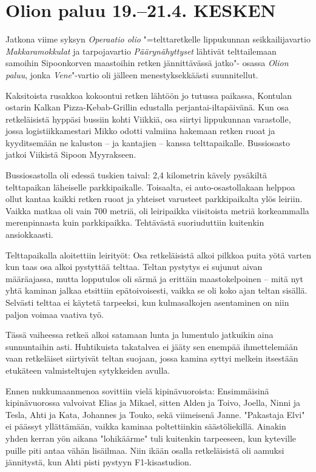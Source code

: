 
\section{Olion paluu 19.--21.4. KESKEN}

\begin{multicols}{2}

	\noindent Jatkona viime syksyn \textit{Operaatio olio} "=telttaretkelle lippukunnan
	seikkailijavartio \textit{Makkaramokkulat} ja tarpojavartio \textit{Päärynähyttyset} lähtivät
	telttailemaan samoihin Sipoonkorven maastoihin retken jännittävässä jatko"-
	osassa \textit{Olion paluu}, jonka \textit{Vene}"-vartio oli jälleen menestyksekkäästi
	suunnitellut.

	Kaksitoista rusakkoa kokoontui retken lähtöön jo tutussa paikassa,
	Kontulan ostarin Kalkan Pizza-Kebab-Grillin edustalla
	perjantai-iltapäivänä. Kun osa retkeläisistä hyppäsi bussiin kohti
	Viikkiä, osa siirtyi lippukunnan varastolle, jossa logistiikkamestari
	Mikko odotti valmiina hakemaan retken ruoat ja kyyditsemään ne kaluston
	– ja kantajien – kanssa telttapaikalle. Bussiosasto jatkoi Viikistä
	Sipoon Myyrakseen. 

	Bussiosastolla oli edessä tuskien taival: 2,4 kilometrin kävely
	pysäkiltä telttapaikan läheiselle parkkipaikalle. Toisaalta, ei
	auto-osastollakaan helppoa ollut kantaa kaikki retken ruoat ja yhteiset
	varusteet parkkipaikalta ylös leiriin. Vaikka matkaa oli vain 700
	metriä, oli leiripaikka viisitoista metriä korkeammalla merenpinnasta
	kuin parkkipaikka. Tehtävästä suoriuduttiin kuitenkin ansiokkaasti.

	Telttapaikalla aloitettiin leirityöt: Osa retkeläisistä alkoi pilkkoa
	puita yötä varten kun taas osa alkoi pystyttää telttaa. Teltan pystytys
	ei sujunut aivan määräajassa, mutta lopputulos oli särmä ja erittäin
	maastokelpoinen – mitä nyt yhtä kaminan jalkaa etsittiin
	epätoivoisesti, vaikka se oli koko ajan teltan sisällä. Selvästi
	telttaa ei käytetä tarpeeksi, kun kulmasalkojen asentaminen on niin
	paljon voimaa vaativa työ.

	Tässä vaiheessa retkeä alkoi satamaan lunta ja lumentulo jatkuikin aina
	sunnuntaihin asti. Huhtikuista takatalvea ei jääty sen enempää
	ihmettelemään vaan retkeläiset siirtyivät teltan suojaan, jossa kamina
	syttyi melkein itsestään etukäteen valmisteltujen sytykkeiden avulla. 

	Ennen nukkumaanmenoa sovittiin vielä kipinävuoroista: Ensimmäisinä
	kipinävuorossa valvoivat Elias ja Mikael, sitten Alden ja Toivo,
	Joella, Ninni ja Tesla, Ahti ja Kata, Johannes ja Touko, sekä
	viimeisenä Janne. "Pakastaja Elvi" ei päässyt yllättämään, vaikka
	kaminaa poltettiinkin säästöliekillä. Ainakin yhden kerran yön aikana
	"lohikäärme" tuli kuitenkin tarpeeseen, kun kyteville puille piti antaa
	vähän lisäilmaa. Niin ikään osalla retkeläisistä oli aamuksi
	jännitystä, kun Ahti pisti pystyyn F1-kisastudion.


\end{multicols}
